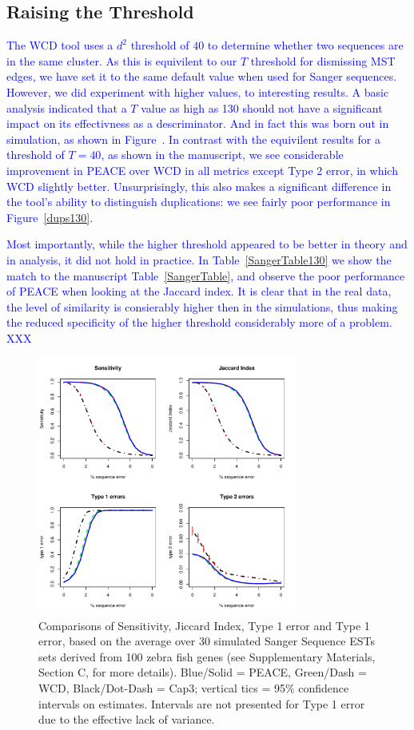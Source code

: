 \documentclass[a4paper,12pt]{article}
\newcommand{\mc}[1]{\textcolor{blue}{#1}}
\newcommand{\peace} {{\small PEACE}}
\newcommand{\wcd} {{\small WCD}}
\newcommand{\capthree} {{\small Cap3}}
\begin{document}
\begin{appendix}
\subsection{Raising the Threshold}
\mc{ 
  The \wcd\/ tool uses a $d^2$ threshold of $40$ to determine whether
  two sequences are in the same cluster.  As this is equivilent to our
  $T$ threshold for dismissing MST edges, we have set it to the same
  default value when used for Sanger sequences.  However, we did
  experiment with higher values, to interesting results.  A basic
  analysis indicated that a $T$ value as high as 130 should not have a
  significant impact on its effectivness as a descriminator.  And in
  fact this was born out in simulation, as shown in
  Figure~\label{SiJiT1T2130}.  In contrast with the equivilent results
  for a threshold of $T=40$, as shown in the manuscript, we see
  considerable improvement in \peace\/ over \wcd\/ in all metrics
  except Type 2 error, in which \wcd\/ slightly
  better. Unsurprisingly, this also makes a significant difference in
  the tool's ability to distinguish duplications: we see fairly poor
  performance in Figure~\ref{dups130}.  
}

\mc{
  Most importantly, while the higher threshold appeared to be better
  in theory and in analysis, it did not hold in practice.  In
  Table~\ref{SangerTable130} we show the match to the manuscript
  Table~\ref{SangerTable}, and observe the poor performance of
  \peace\/ when looking at the Jaccard index.  It is clear that in the
  real data, the level of similarity is consierably higher then in the
  simulations, thus making the reduced specificity of the higher
  threshold considerably more of a problem.
XXX}


\begin{figure}
  \centerline{\includegraphics[width=3.35in]{pics.d/SeJiT1T2x40.pdf}}
  \caption{Comparisons of Sensitivity, Jiccard Index, Type 1 error and
    Type 1 error, based on the
    average over 30 simulated Sanger Sequence ESTs sets derived from 100 zebra
    fish genes  (see
    Supplementary Materials, Section C, for more details).  Blue/Solid
    = \peace, Green/Dash = \wcd, Black/Dot-Dash = \capthree; vertical
    tics = 95\% confidence intervals on estimates.  Intervals are not
    presented for Type 1 error due to the effective lack of
    variance.}\label{SeJiT1T2130}
\end{figure}


\end{appendix}
\end{document}
